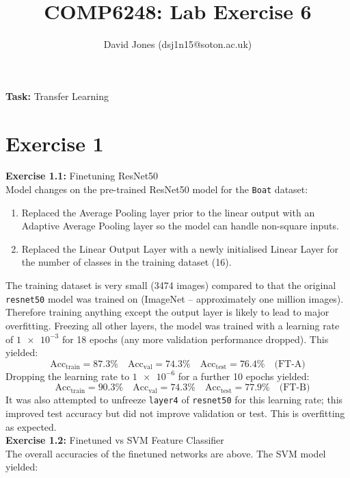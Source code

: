 \documentclass[11pt,a4paper]{article}
\title{COMP6248: Lab Exercise 6}
\author{
David Jones (dsj1n15@soton.ac.uk)}
\date{}
\begin{document}
\maketitle
\textbf{Task:} Transfer Learning
\vspace{-0.5em}
\section{Exercise 1}
\textbf{Exercise 1.1:} Finetuning ResNet50\vspace{0.5em}\\
Model changes on the pre-trained ResNet50 model for the \texttt{Boat} dataset:
\begin{enumerate}
    \item Replaced the Average Pooling layer prior to the linear output with an Adaptive Average Pooling layer so the model can handle non-square inputs.
    \item Replaced the Linear Output Layer with a newly initialised Linear Layer for the number of classes in the training dataset (16).
\end{enumerate}

\noindent The training dataset is very small (3474 images) compared to that the original \texttt{resnet50} model was trained on (ImageNet -- approximately one million images). Therefore training anything except the output layer is likely to lead to major overfitting. Freezing all other layers, the model was trained with a learning rate of $\num{1e-3}$ for 18 epochs (any more validation performance dropped). This yielded:
\begin{equation*}
    \text{Acc}_\text{train} = 87.3\% \quad \text{Acc}_\text{val} = 74.3\% \quad \text{Acc}_\text{test} = 76.4\% \quad \text{(FT-A)}
\end{equation*}
Dropping the learning rate to $\num{1e-6}$ for a further 10 epochs yielded:
\begin{equation*}
    \quad\text{Acc}_\text{train} = 90.3\% \quad \text{Acc}_\text{val} = 74.3\% \quad \text{Acc}_\text{test} = 77.9\% \quad \text{(FT-B)}
\end{equation*}
It was also attempted to unfreeze \texttt{layer4} of \texttt{resnet50} for this learning rate; this improved test accuracy but did not improve validation or test. This is overfitting as expected.\\

\noindent\textbf{Exercise 1.2:} Finetuned vs SVM Feature Classifier\vspace{0.5em}\\
The overall accuracies of the finetuned networks are above. The SVM model yielded:
\end{document}
